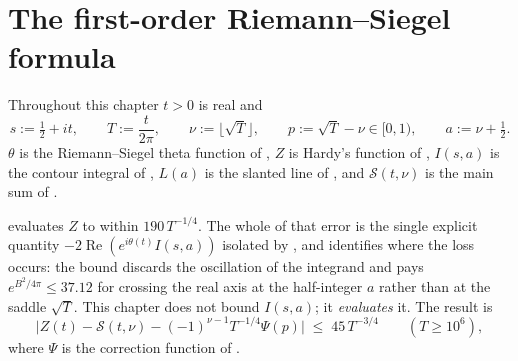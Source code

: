%
%
%
%
%
%
%

\chapter{The first-order Riemann--Siegel formula}
\label{cha:rs_first}

Throughout this chapter $t>0$ is real and
\[
  s:=\tfrac12+it,\qquad T:=\frac{t}{2\pi},\qquad \nu:=\lfloor\sqrt T\rfloor,
  \qquad p:=\sqrt T-\nu\in[0,1),\qquad a:=\nu+\tfrac12 .
\]
$\theta$ is the Riemann--Siegel theta function of , $Z$ is Hardy's function
of , $I(s,a)$ is the contour integral of ,
$L(a)$ is the slanted line of , and $\mathcal{S}(t,\nu)$ is the main sum of
.

 evaluates $Z$ to within $190\,T^{-1/4}$.  The whole of that error is the
single explicit quantity $-2\operatorname{Re}(e^{i\theta(t)}I(s,a))$ isolated by
, and  identifies where the loss occurs: the bound
 discards the oscillation of the integrand and pays
$e^{B^{2}/4\pi}\le37.12$ for crossing the real axis at the half-integer $a$ rather than at the
saddle $\sqrt T$.  This chapter does not bound $I(s,a)$; it \emph{evaluates} it.  The result is
\[
  \bigl\lvert Z(t)-\mathcal{S}(t,\nu)-(-1)^{\nu-1}T^{-1/4}\Psi(p)\bigr\rvert\;\le\;45\,T^{-3/4}
  \qquad(T\ge10^{6}),
\]
where $\Psi$ is the correction function of .

